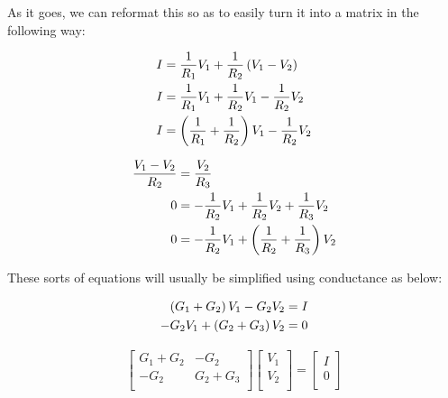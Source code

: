 As it goes, we can reformat this so as to easily turn it into a matrix in the following way: 

\begin{equation} \label{lattice2}
\begin{split}
I &= \frac{1}{R_1}V_1 + \frac{1}{R_2}\left(V_1 - V_2\right)\\
I &= \frac{1}{R_1}V_1 + \frac{1}{R_2}V_1 - \frac{1}{R_2}V_2\\
I &= \left(\frac{1}{R_1} + \frac{1}{R_2}\right)V_1 - \frac{1}{R_2}V_2\\
\end{split}
\end{equation}

\begin{equation} \label{lattice3}
\begin{split}
\frac{V_1 - V_2}{R_2} &= \frac{V_2}{R_3} \\
0 &= - \frac{1}{R_2}V_1 + \frac{1}{R_2}V_2 + \frac{1}{R_3}V_2 \\
0 &= - \frac{1}{R_2}V_1 + \left(\frac{1}{R_2} + \frac{1}{R_3}\right)V_2 \\
\end{split}
\end{equation}

These sorts of equations will usually be simplified using conductance as below: 

\begin{equation} \label{lattice4}
\begin{split}
\left(G_1 + G_2\right)V_1 - G_2V_2 &= I\\
- G_2V_1 + \left(G_2 + G_3\right)V_2 &= 0 \\
\end{split}
\end{equation}

\begin{align}
\begin{bmatrix} 
G_1 + G_2       &   - G_2             \\
- G_2           &   G_2 + G_3       \\
\end{bmatrix}
\begin{bmatrix} 
V_1      \\
V_2      \\
\end{bmatrix}
= 
\begin{bmatrix} 
I     \\
0      \\
\end{bmatrix}
\end{align}

